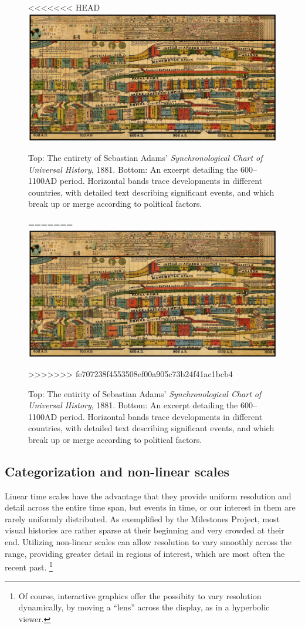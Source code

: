 \begin{figure}[!htb]
  \centering
<<<<<<< HEAD
  \includegraphics[width=\textwidth,clip]{fig/Adams1881-5}
  \caption{Top: The entirety of Sebastian Adams' \emph{Synchronological Chart of Universal History}, 1881. Bottom: An excerpt detailing the 600--1100AD period. Horizontal bands trace developments in different countries, with detailed text describing significant events, and which break up or merge according to political factors.}
=======
  \includegraphics[width=\textwidth,clip]{fig/Adams1881-6}
  \caption{Top: The entirity of Sebastian Adams' \emph{Synchronological Chart of Universal History}, 1881. Bottom: An excerpt detailing the 600--1100AD period. Horizontal bands trace developments in different countries, with detailed text describing significant events, and which break up or merge according to political factors.}
>>>>>>> fe707238f4553508ef00a905c73b24f41ac1bcb4
  \label{fig:Adams1881}
\end{figure}

\subsection{Categorization and non-linear scales}
Linear time scales have the advantage that they provide uniform resolution and detail across the entire time span, but events in time, or our interest in them are rarely uniformly distributed. As exemplified by the Milestones Project, most visual histories are rather sparse at their beginning and very crowded at their end. Utilizing non-linear scales can allow resolution to vary smoothly across the range, providing greater detail in regions of interest, which are most often the recent past.%
\footnote{
Of course, interactive graphics offer the possibity to vary resolution dynamically, by moving a ``lens'' across the display, as in
a hyperbolic viewer.
}

